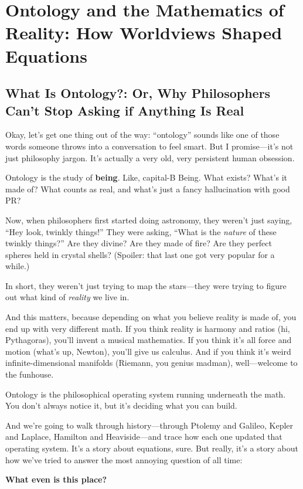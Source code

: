 \section{Ontology and the Mathematics of Reality: How Worldviews Shaped Equations}

\subsection{What Is Ontology?: Or, Why Philosophers Can't Stop Asking if Anything Is Real}

Okay, let’s get one thing out of the way: “ontology” sounds like one of those words someone throws into a conversation to feel smart. But I promise—it’s not just philosophy jargon. It’s actually a very old, very persistent human obsession. 

Ontology is the study of \textbf{being}. Like, capital-B Being. What exists? What’s it made of? What counts as real, and what’s just a fancy hallucination with good PR?

Now, when philosophers first started doing astronomy, they weren’t just saying, “Hey look, twinkly things!” They were asking, “What is the \emph{nature} of these twinkly things?” Are they divine? Are they made of fire? Are they perfect spheres held in crystal shells? (Spoiler: that last one got very popular for a while.)

In short, they weren’t just trying to map the stars—they were trying to figure out what kind of \emph{reality} we live in.

And this matters, because depending on what you believe reality is made of, you end up with very different math. If you think reality is harmony and ratios (hi, Pythagoras), you’ll invent a musical mathematics. If you think it’s all force and motion (what’s up, Newton), you’ll give us calculus. And if you think it’s weird infinite-dimensional manifolds (Riemann, you genius madman), well—welcome to the funhouse.

Ontology is the philosophical operating system running underneath the math. You don’t always notice it, but it’s deciding what you can build.

And we’re going to walk through history—through Ptolemy and Galileo, Kepler and Laplace, Hamilton and Heaviside—and trace how each one updated that operating system. It’s a story about equations, sure. But really, it’s a story about how we’ve tried to answer the most annoying question of all time:

\textbf{What even is this place?}


